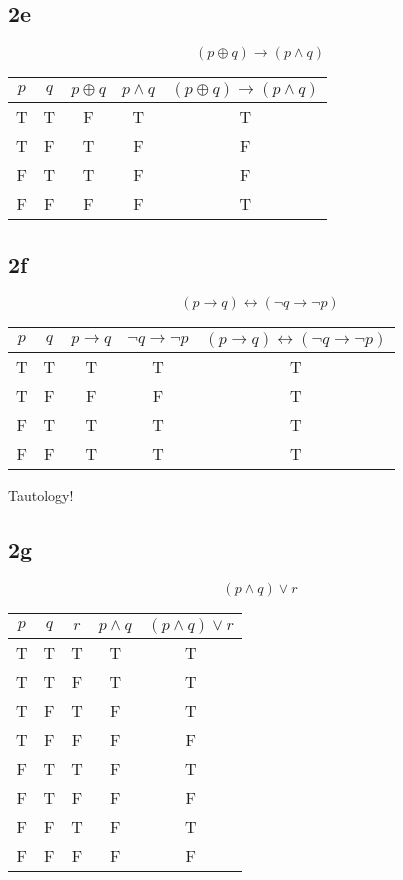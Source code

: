 \documentclass{math}
\begin{document}
\subsection*{2e}
\[ (p \oplus q) \to (p \wedge q) \]
\begin{center}
  \begin{tabular}{|c|c|c|c|c|}
    \hline
    \( p \) & \( q \) & \( p \oplus q \) & \( p \wedge q \) &
        \( (p \oplus q) \to (p \wedge q) \) \\ \hline
    T & T & F & T & T \\ \hline
    T & F & T & F & F \\ \hline
    F & T & T & F & F \\ \hline
    F & F & F & F & T \\ \hline
  \end{tabular}
\end{center}

\subsection*{2f}
\[ (p \to q) \leftrightarrow (\neg{q} \to \neg{p}) \]
\begin{center}
  \begin{tabular}{|c|c|c|c|c|}
    \hline
    \( p \) & \( q \) & \( p \to q \) & \( \neg{q} \to \neg{p} \) &
        \( (p \to q) \leftrightarrow (\neg{q} \to \neg{p}) \) \\ \hline
    T & T & T & T & T \\ \hline
    T & F & F & F & T \\ \hline
    F & T & T & T & T \\ \hline
    F & F & T & T & T \\ \hline
  \end{tabular}
\end{center}
Tautology!

\subsection*{2g}
\[ (p \wedge q) \vee r \]
\begin{center}
  \begin{tabular}{|c|c|c|c|c|}
    \hline
    \( p \) & \( q \) & \( r \) & \( p \wedge q \) & \( (p \wedge q) \vee r \)
        \\ \hline
    T & T & T & T & T \\ \hline
    T & T & F & T & T \\ \hline
    T & F & T & F & T \\ \hline
    T & F & F & F & F \\ \hline
    F & T & T & F & T \\ \hline
    F & T & F & F & F \\ \hline
    F & F & T & F & T \\ \hline
    F & F & F & F & F \\ \hline
  \end{tabular}
\end{center}
\end{document}
